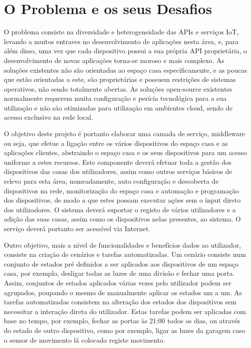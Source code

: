 \chapter{O Problema e os seus Desafios}

O problema consiste na diversidade e heterogeneidade das APIs e serviços IoT, levando a muitos entraves no desenvolvimento de aplicações nesta área, e, para além disso, uma vez que cada dispositivo possui a sua própria API proprietária, o desenvolvimento de novas aplicações torna-se moroso e mais complexo. As soluções existentes não são orientadas ao espaço casa especificamente, e as poucas que estão orientadas a este, são proprietárias e possuem restrições de sistemas operativos, não sendo totalmente abertas.  As soluções open-source existentes normalmente requerem muita configuração e perícia tecnológica para a sua utilização e não são otimizadas para utilização em ambientes cloud, sendo de acesso exclusivo na rede local.

O objetivo deste projeto é portanto elaborar uma camada de serviço, middleware ou seja, que efetue a ligação entre os vários dispositivos do espaço casa e as aplicações clientes, abstraindo o espaço casa e os seus dispositivos para um acesso uniforme a estes recursos. Este componente deverá efetuar toda a gestão dos dispositivos das casas dos utilizadores, assim como outros serviços básicos de relevo para esta área, nomeadamente, auto configuração e descoberta de dispositivos na rede, monitorização do espaço casa e automação e programação dos dispositivos, de modo a que estes possam executar ações sem o input direto dos utilizadores. O sistema deverá suportar o registo de vários utilizadores e a adição das suas casas, assim como os dispositivos nelas presentes, ao sistema. O serviço deverá portanto ser acessível via Internet.

Outro objetivo, mais a nível de funcionalidades e benefícios dados ao utilizador, consiste na criação de cenários e tarefas automatizadas. Um cenário consiste num conjunto de estados pré definidos a ser aplicados aos dispositivos de um espaço casa, por exemplo, desligar todas as luzes de uma divisão e fechar uma porta. Assim, conjuntos de estados aplicados várias vezes pelo utilizador podem ser agrupados, poupando o mesmo de manualmente aplicar os estados um a um. As tarefas automatizadas consistem na alteração dos estados dos dispositivos sem necessitar a interação direta do utilizador. Estas tarefas podem ser aplicadas com base no tempo, por exemplo, fechar as portas às 21:00 todos os dias, ou através do estado de outro dispositivo, como por exemplo, ligar as luzes da garagem caso o sensor de movimento lá colocado registe movimento.


